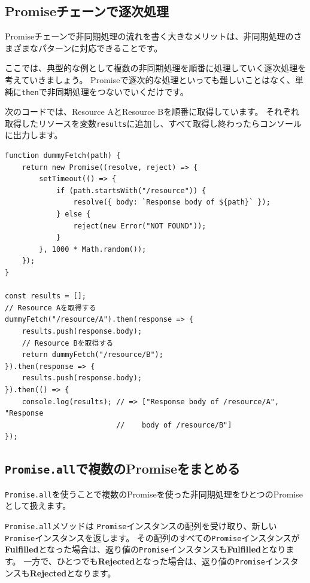 \hypertarget{promise-sequential}{%
\subsection{Promiseチェーンで逐次処理}\label{promise-sequential}}

Promiseチェーンで非同期処理の流れを書く大きなメリットは、非同期処理のさまざまなパターンに対応できることです。

ここでは、典型的な例として複数の非同期処理を順番に処理していく逐次処理を考えていきましょう。
Promiseで逐次的な処理といっても難しいことはなく、単純に\texttt{then}で非同期処理をつないでいくだけです。

次のコードでは、Resource AとResource Bを順番に取得しています。
それぞれ取得したリソースを変数\texttt{results}に追加し、すべて取得し終わったらコンソールに出力します。

\begin{lstlisting}
function dummyFetch(path) {
    return new Promise((resolve, reject) => {
        setTimeout(() => {
            if (path.startsWith("/resource")) {
                resolve({ body: `Response body of ${path}` });
            } else {
                reject(new Error("NOT FOUND"));
            }
        }, 1000 * Math.random());
    });
}

const results = [];
// Resource Aを取得する
dummyFetch("/resource/A").then(response => {
    results.push(response.body);
    // Resource Bを取得する
    return dummyFetch("/resource/B");
}).then(response => {
    results.push(response.body);
}).then(() => {
    console.log(results); // => ["Response body of /resource/A", "Response 
                          //    body of /resource/B"]
});
\end{lstlisting}

\hypertarget{promise-all}{%
\subsection{\texorpdfstring{\texttt{Promise.all}で複数のPromiseをまとめる}{Promise.allで複数のPromiseをまとめる}}\label{promise-all}}

\texttt{Promise.all}を使うことで複数のPromiseを使った非同期処理をひとつのPromiseとして扱えます。

\texttt{Promise.all}メソッドは
\texttt{Promise}インスタンスの配列を受け取り、新しい\texttt{Promise}インスタンスを返します。
その配列のすべての\texttt{Promise}インスタンスが\textbf{Fulfilled}となった場合は、返り値の\texttt{Promise}インスタンスも\textbf{Fulfilled}となります。
一方で、ひとつでも\textbf{Rejected}となった場合は、返り値の\texttt{Promise}インスタンスも\textbf{Rejected}となります。

